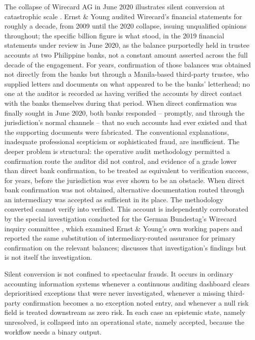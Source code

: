 \documentclass[11pt,a4paper]{article}
\theoremstyle{definition}
\theoremstyle{remark}
\begin{document}
The collapse of Wirecard AG in June 2020 illustrates silent conversion at catastrophic scale \citep{mccrum2022, esma2020}. Ernst \& Young audited Wirecard's financial statements for roughly a decade, from 2009 until the 2020 collapse, issuing unqualified opinions throughout; the specific  billion figure is what stood, in the 2019 financial statements under review in June 2020, as the balance purportedly held in trustee accounts at two Philippine banks, not a constant amount asserted across the full decade of the engagement. For years, confirmation of those balances was obtained not directly from the banks but through a Manila-based third-party trustee, who supplied letters and documents on what appeared to be the banks' letterhead; no one at the auditor is recorded as having verified the accounts by direct contact with the banks themselves during that period. When direct confirmation was finally sought in June 2020, both banks responded -- promptly, and through the jurisdiction's normal channels -- that no such accounts had ever existed and that the supporting documents were fabricated. The conventional explanations, inadequate professional scepticism or sophisticated fraud, are insufficient. The deeper problem is structural: the operative audit methodology permitted a confirmation route the auditor did not control, and evidence of a grade lower than direct bank confirmation, to be treated as equivalent to verification success, for years, before the jurisdiction was ever shown to be an obstacle. When direct bank confirmation was not obtained, alternative documentation routed through an intermediary was accepted as sufficient in its place. The methodology converted cannot verify into verified. This account is independently corroborated by the special investigation conducted for the German Bundestag's Wirecard inquiry committee \citep{wambach2021}, which examined Ernst \& Young's own working papers and reported the same substitution of intermediary-routed assurance for primary confirmation on the relevant balances; \citet{beerbaum2020} discusses that investigation's findings but is not itself the investigation.

Silent conversion is not confined to spectacular frauds. It occurs in ordinary accounting information systems whenever a continuous auditing dashboard clears deprioritised exceptions that were never investigated, whenever a missing third-party confirmation becomes a no exception noted entry, and whenever a null risk field is treated downstream as zero risk. In each case an epistemic state, namely unresolved, is collapsed into an operational state, namely accepted, because the workflow needs a binary output.
\end{document}
